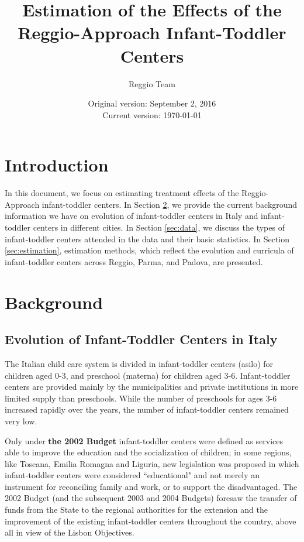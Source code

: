 



\title{Estimation of the Effects of the Reggio-Approach Infant-Toddler Centers}
\author{Reggio Team}
\date{Original version: September 2, 2016 \\ Current version: \today}
\maketitle

\doublespacing

\section{Introduction}
In this document, we focus on estimating treatment effects of the Reggio-Approach infant-toddler centers. In Section \ref{sec:background}, we provide the current background information we have on evolution of infant-toddler centers in Italy and infant-toddler centers in different cities. In Section \ref{sec:data}, we discuss the types of infant-toddler centers attended in the data and their basic statistics. In Section \ref{sec:estimation}, estimation methods, which reflect the evolution and curricula of infant-toddler centers across Reggio, Parma, and Padova, are presented.


\section{Background} \label{sec:background}
\subsection{Evolution of Infant-Toddler Centers in Italy}
The Italian child care system is divided in infant-toddler centers (asilo) for children aged 0-3, and preschool (materna) for children aged 3-6. Infant-toddler centers are provided mainly by the municipalities and private institutions in more limited supply than preschools. While the number of preschools for ages 3-6 increased rapidly over the years, the number of infant-toddler centers remained very low.  

Only under \textbf{the 2002 Budget} infant-toddler centers were defined as services able to improve the education and the socialization of children; in some regions, like Toscana, Emilia Romagna and Liguria, new legislation was proposed in which infant-toddler centers were considered ``educational" and not merely an instrument for reconciling family and work, or to support the disadvantaged. The 2002 Budget (and the subsequent 2003 and 2004 Budgets) foresaw the transfer of funds from the State to the regional authorities for the extension and the improvement of the existing infant-toddler centers throughout the country, above all in view of the Lisbon Objectives. 

